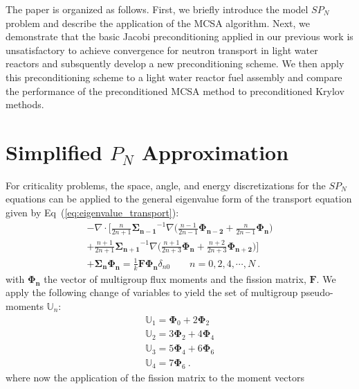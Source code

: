 \documentclass[letterpaper,12pt]{article}
\begin{document}
The paper is organized as follows. First, we briefly introduce the
model $SP_N$ problem and describe the application of the MCSA
algorithm. Next, we demonstrate that the basic Jacobi preconditioning
applied in our previous work is unsatisfactory to achieve convergence
for neutron transport in light water reactors and subsquently develop
a new preconditioning scheme. We then apply this preconditioning
scheme to a light water reactor fuel assembly and compare the
performance of the preconditioned MCSA method to preconditioned Krylov
methods.

\section{Simplified $P_N$ Approximation}
For criticality problems, the space, angle, and energy discretizations
for the $SP_N$ equations can be applied to the general eigenvalue form
of the transport equation given by
Eq~(\ref{eq:eigenvalue_transport}):
\begin{multline}
  -\nabla \cdot \Bigg[\frac{n}{2n+1}\mathbf{\Sigma_{n-1}}^{-1} \nabla
    \Big(\frac{n-1}{2n-1} \mathbf{\Phi_{n-2}} +
    \frac{n}{2n-1}\mathbf{\Phi_n} \Big) \\+
    \frac{n+1}{2n+1}\mathbf{\Sigma_{n+1}}^{-1} \nabla
    \Big(\frac{n+1}{2n+3}\mathbf{\Phi_n} +
    \frac{n+2}{2n+3}\mathbf{\Phi_{n+2}}\Big) \Bigg] \\+
  \mathbf{\Sigma_n} \mathbf{\Phi_n} = \frac{1}{k} \mathbf{F}
  \mathbf{\Phi_n} \delta_{n0} \ \ \ \ \ \ \ \ \ n = 0,2,4,\cdots,N\:.
  \label{eq:multigroup_spn_eigenvalue}
\end{multline}
with $\mathbf{\Phi_n}$ the vector of multigroup flux moments and the
fission matrix, $\mathbf{F}$. We apply the following change of
variables to yield the set of multigroup pseudo-moments
$\mathbb{U}_n$:
\begin{subequations}
  \begin{gather}
    \mathbb{U}_1 = \mathbf{\Phi}_0 + 2\mathbf{\Phi}_2 \\
    \mathbb{U}_2 = 3\mathbf{\Phi}_2 + 4\mathbf{\Phi}_4 \\
    \mathbb{U}_3 = 5\mathbf{\Phi}_4 + 6\mathbf{\Phi}_6 \\
    \mathbb{U}_4 = 7\mathbf{\Phi}_6 \:.
  \end{gather}
  \label{eq:spn7_subs}
\end{subequations}
where now the application of the fission matrix to the moment vectors
\end{document}

